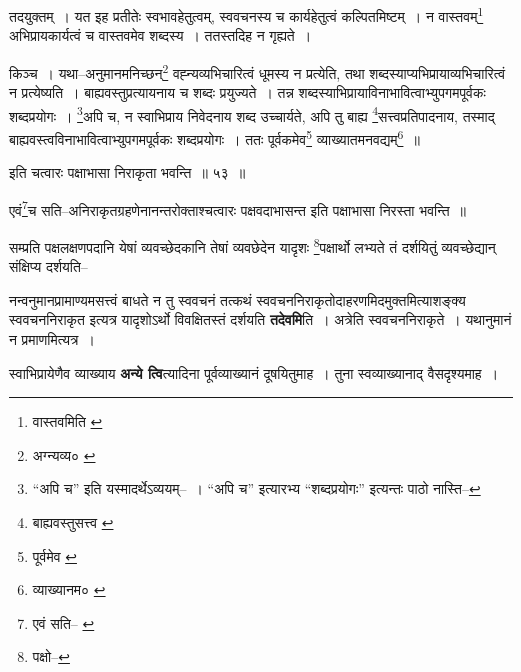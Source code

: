 \documentclass[article,12pt,a4paper]{memoir}
\begin{document}
	  \pstart तदयुक्तम् । यत इह प्रतीतेः स्वभावहेतुत्वम्, स्ववचनस्य च कार्यहेतुत्वं कल्पितमिष्टम् । न वास्तवम्\footnote{वास्तवमिति \cite{dp-msC} \cite{dp-msD}} अभिप्रायकार्यत्वं च वास्तवमेव शब्दस्य । ततस्तदिह न गृह्यते ।
	\pend
       

	  \pstart किञ्च । यथा--अनुमानमनिच्छन्\footnote{अग्न्यव्य० \cite{dp-msD}} वह्न्यव्यभिचारित्वं धूमस्य न प्रत्येति, तथा शब्दस्याप्यभिप्रायाव्यभिचारित्वं न प्रत्येष्यति । बाह्यवस्तुप्रत्यायनाय च शब्दः प्रयुज्यते । तन्न शब्दस्याभिप्रायाविनाभावित्वाभ्युपगमपूर्वकः शब्दप्रयोगः । \footnote{“अपि च” इति यस्मादर्थेऽव्ययम्--\cite{dp-msD-n} । “अपि च” इत्यारभ्य “शब्दप्रयोगः” इत्यन्तः पाठो नास्ति--\cite{dp-msB}}\-अपि च, न स्वाभिप्राय निवेदनाय शब्द उच्चार्यते, अपि तु बाह्य \footnote{बाह्यवस्तुसत्त्व \cite{dp-msA} \cite{dp-msB} \cite{dp-msC} \cite{dp-msD} \cite{dp-edP} \cite{dp-edH} \cite{dp-edE} \cite{dp-edN}}\-सत्त्वप्रतिपादनाय, तस्माद् बाह्यवस्त्वविनाभावित्वाभ्युपगमपूर्वकः शब्दप्रयोगः । ततः पूर्वकमेव\footnote{पूर्वमेव \cite{dp-edE}} व्याख्यातमनवद्यम्\footnote{व्याख्यानम० \cite{dp-msA} \cite{dp-msB} \cite{dp-msC} \cite{dp-msD} \cite{dp-edP} \cite{dp-edH} \cite{dp-edE} \cite{dp-edN}} ॥
	\pend
       
	  \bigskip
	  \begingroup
	

	  \pstart इति चत्वारः पक्षाभासा निराकृता भवन्ति ॥ ५३ ॥
	\pend
      
	  \endgroup
	 

	  \pstart एवं\footnote{एवं सति--\cite{dp-msA} \cite{dp-edP} \cite{dp-edN}}\-च सति--अनिराकृतग्रहणेनानन्तरोक्ताश्चत्वारः पक्षवदाभासन्त इति पक्षाभासा निरस्ता भवन्ति ॥
	\pend
       

	  \pstart सम्प्रति पक्षलक्षणपदानि येषां व्यवच्छेदकानि तेषां व्यवछेदेन यादृशः \footnote{पक्षो--\cite{dp-msC}}\-पक्षार्थो लभ्यते तं दर्शयितुं व्यवच्छेद्यान् संक्षिप्य दर्शयति--
	\pend
      
	  \endgroup
	

	  \pstart नन्वनुमानप्रामाण्यमसत्त्वं बाधते न तु स्ववचनं तत्कथं स्ववचननिराकृतोदाहरणमिदमुक्तमित्याशङ्क्य स्ववचननिराकृत इत्यत्र यादृशोऽर्थो विवक्षितस्तं दर्शयति \textbf{तदेवमि}ति । अत्रेति स्ववचननिराकृते । यथानुमानं न प्रमाणमित्यत्र ।
	\pend
      

	  \pstart स्वाभिप्रायेणैव व्याख्याय \textbf{अन्ये त्वि}त्यादिना पूर्वव्याख्यानं दूषयितुमाह । तुना स्वव्याख्यानाद् वैसदृश्यमाह ।
	\pend
      
\end{document}
